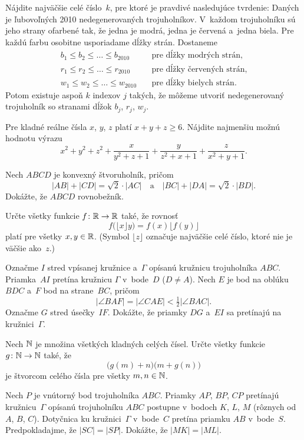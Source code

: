 {%
Nájdite najväčšie celé číslo~$k$, pre ktoré je pravdivé nasledujúce tvrdenie:
Daných je ľubovoľných 2010 nedegenerovaných trojuholníkov. V~každom trojuholníku sú jeho strany ofarbené tak, že jedna je modrá, jedna je červená a~jedna biela. Pre každú farbu osobitne usporiadame dĺžky strán. Dostaneme
$$
\begin{align*}
b_1\le b_2 \le \dots \le b_{2010} &\quad \text{pre dĺžky modrých strán},\\
r_1\le r_2 \le \dots \le r_{2010} &\quad \text{pre dĺžky červených strán},\\
w_1\le w_2 \le \dots \le w_{2010} &\quad \text{pre dĺžky bielych strán}.
\end{align*}
$$
Potom existuje aspoň $k$ indexov $j$ takých, že môžeme utvoriť nedegenerovaný trojuholník so stranami dĺžok $b_j$, $r_j$, $w_j$.}

{%
Pre kladné reálne čísla $x$, $y$, $z$ platí $x+y+z\ge 6$. Nájdite najmenšiu možnú hodnotu výrazu
$$
x^2+y^2+z^2+\frac{x}{y^2+z+1}+\frac{y}{z^2+x+1}+\frac{z}{x^2+y+1}.
$$}

{%
Nech $ABCD$ je konvexný štvoruholník, pričom
$$
|AB|+|CD|=\sqrt{2}\cdot|AC| \quad \text{a} \quad |BC|+|DA|=\sqrt{2}\cdot |BD|.
$$
Dokážte, že $ABCD$ rovnobežník.}

{%
Určte všetky funkcie $f \colon \Bbb R \to \Bbb R$ také, že rovnosť
$$
  f\bigl(\lfloor x\rfloor y\bigr) = f(x)\bigl\lfloor f(y)\bigr\rfloor
$$
platí pre všetky $x,y \in \Bbb R$.
(Symbol $\lfloor z\rfloor$ označuje najväčšie celé číslo, ktoré nie je väčšie ako~$z$.)}

{%
Označme $I$ stred vpísanej kružnice a~$\Gamma$ opísanú kružnicu trojuholníka $ABC$. Priamka~$AI$ pretína kružnicu $\Gamma$ v~bode~$D$ ($D\ne A$).  Nech $E$ je bod na oblúku $BDC$ a~$F$ bod na strane~$BC$, pričom
$$
|\angle BAF| = |\angle CAE| < \tfrac{1}{2}|\angle BAC|.
$$
Označme $G$ stred úsečky~$IF$. Dokážte, že priamky $DG$ a~$EI$ sa pretínajú na kružnici~$\Gamma$.}

{%
Nech $\Bbb N$ je množina všetkých kladných celých čísel. Určte všetky funkcie $g\colon\Bbb N \to \Bbb N$ také, že
$$
\bigl(g(m)+n\bigr)\bigl(m+g(n)\bigr)
$$
je štvorcom celého čísla pre všetky  $m,n \in \Bbb N$.}

{%
Nech $P$ je vnútorný bod trojuholníka $ABC$. Priamky $AP$, $BP$, $CP$
pretínajú kružnicu~$\Gamma$ opísanú trojuholníku $ABC$ postupne v~bodoch $K$, $L$, $M$ (rôznych od $A$, $B$, $C$). Dotyčnica ku kružnici~$\Gamma$ v~bode~$C$ pretína priamku $AB$ v~bode~$S$. Predpokladajme, že $|SC|=|SP|$. Dokážte, že $|MK|=|ML|$.}

